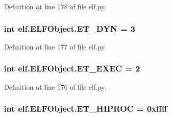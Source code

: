 Definition at line 178 of file elf.\+py.

\subsubsection[{\texorpdfstring{E\+T\+\_\+\+D\+YN}{ET_DYN}}]{\setlength{\rightskip}{0pt plus 5cm}int elf.\+E\+L\+F\+Object.\+E\+T\+\_\+\+D\+YN = 3\hspace{0.3cm}{\ttfamily [static]}}\hypertarget{clasself_1_1_e_l_f_object_a01223871ee1c400f781465b797e38acf}{}\label{clasself_1_1_e_l_f_object_a01223871ee1c400f781465b797e38acf}


Definition at line 177 of file elf.\+py.

\subsubsection[{\texorpdfstring{E\+T\+\_\+\+E\+X\+EC}{ET_EXEC}}]{\setlength{\rightskip}{0pt plus 5cm}int elf.\+E\+L\+F\+Object.\+E\+T\+\_\+\+E\+X\+EC = 2\hspace{0.3cm}{\ttfamily [static]}}\hypertarget{clasself_1_1_e_l_f_object_aa0096390dda0fa912b1c1aa2e562132d}{}\label{clasself_1_1_e_l_f_object_aa0096390dda0fa912b1c1aa2e562132d}


Definition at line 176 of file elf.\+py.

\subsubsection[{\texorpdfstring{E\+T\+\_\+\+H\+I\+P\+R\+OC}{ET_HIPROC}}]{\setlength{\rightskip}{0pt plus 5cm}int elf.\+E\+L\+F\+Object.\+E\+T\+\_\+\+H\+I\+P\+R\+OC = 0xffff\hspace{0.3cm}{\ttfamily [static]}}\hypertarget{clasself_1_1_e_l_f_object_a3d3ecb47bb55aacdc41bf25a1d921ae4}{}\label{clasself_1_1_e_l_f_object_a3d3ecb47bb55aacdc41bf25a1d921ae4}


